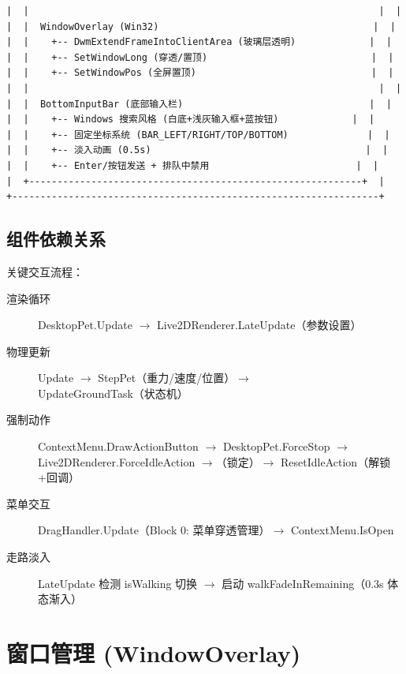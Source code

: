 \documentclass[12pt,a4paper]{ctexart}
\begin{document}
\begin{lstlisting}[frame=single,numbers=none,style=csharp]
|  |                                                              |  |
|  |  WindowOverlay (Win32)                                      |  |
|  |    +-- DwmExtendFrameIntoClientArea (玻璃层透明)             |  |
|  |    +-- SetWindowLong (穿透/置顶)                             |  |
|  |    +-- SetWindowPos (全屏置顶)                               |  |
|  |                                                              |  |
|  |  BottomInputBar (底部输入栏)                                 |  |
|  |    +-- Windows 搜索风格 (白底+浅灰输入框+蓝按钮)             |  |
|  |    +-- 固定坐标系统 (BAR_LEFT/RIGHT/TOP/BOTTOM)              |  |
|  |    +-- 淡入动画 (0.5s)                                      |  |
|  |    +-- Enter/按钮发送 + 排队中禁用                          |  |
|  +-----------------------------------------------------------+  |
+-----------------------------------------------------------------+
\end{lstlisting}

\subsection{组件依赖关系}

关键交互流程：

\begin{description}
    \item[渲染循环] DesktopPet.Update $\to$ Live2DRenderer.LateUpdate（参数设置）
    \item[物理更新] Update $\to$ StepPet（重力/速度/位置）$\to$ UpdateGroundTask（状态机）
    \item[强制动作] ContextMenu.DrawActionButton $\to$ DesktopPet.ForceStop $\to$ \\[2pt]
        \hspace*{2em}Live2DRenderer.ForceIdleAction $\to$（锁定）$\to$ ResetIdleAction（解锁+回调）
    \item[菜单交互] DragHandler.Update（Block 0: 菜单穿透管理）$\to$ ContextMenu.IsOpen
    \item[走路淡入] LateUpdate 检测 isWalking 切换 $\to$ 启动 walkFadeInRemaining（0.3s 体态渐入）
\end{description}

\section{窗口管理 (WindowOverlay)}
\end{document}
